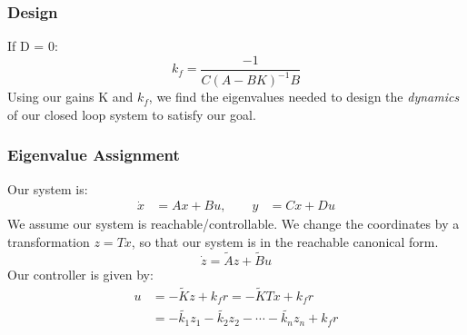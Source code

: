 \documentclass{beamer}
\theoremstyle{remark}
\begin{document}
\begin{frame}
\frametitle{Design}
If D = 0:
\begin{equation}
    k_f = \frac{-1}{C(A-BK)^{-1}B}
\end{equation}
Using our gains K and $k_f$, we find the eigenvalues needed to design the \textsl{dynamics} of our closed loop system to satisfy our goal. 
\end{frame}

\begin{frame}
\frametitle{Eigenvalue Assignment}
Our system is: 
\begin{equation}
\begin{aligned}
    \dot{x} &= Ax + Bu, \qquad y &= Cx + Du
\end{aligned}
\end{equation}
We assume our system is reachable/controllable.
We change the coordinates by a transformation $z=Tx$, so that our system is in the reachable canonical form. 
\begin{equation}
    \dot{z} = \tilde{A} z + \tilde{B} u
\end{equation}
Our controller is given by: 
\begin{equation}
\begin{aligned}
    u &= - \tilde{K}z + k_f r = - \tilde{K} Tx + k_f r \\
      &= -\tilde{k_1} z_1 - \tilde{k_2} z_2 - \cdots - \tilde{k_n} z_n + k_f r
\end{aligned}
\end{equation}
\end{frame}
\end{document}
